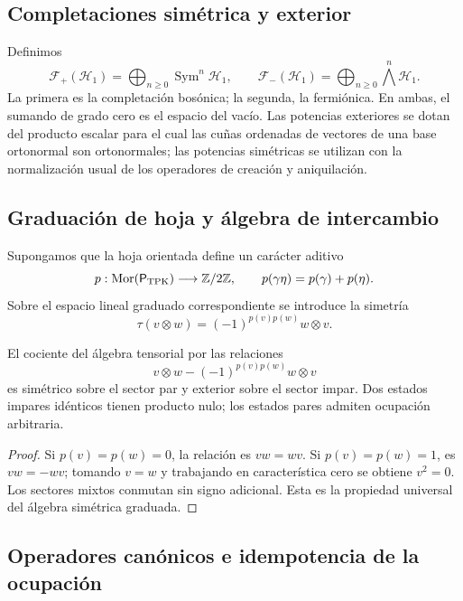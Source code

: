 \subsection{Completaciones simétrica y exterior}
\label{v:v:rec:completaciones:section:03}

Definimos
\[
 \mathcal F_+(\mathcal H_1)=
 \bigoplus_{n\geq0}\operatorname{Sym}^n\mathcal H_1,
 \qquad
 \mathcal F_-(\mathcal H_1)=
 \bigoplus_{n\geq0}\bigwedge^n\mathcal H_1.
\]
La primera es la completación bosónica; la segunda, la fermiónica. En ambas,
el sumando de grado cero es el espacio del vacío. Las potencias exteriores
se dotan del producto escalar para el cual las cuñas ordenadas de vectores
de una base ortonormal son ortonormales; las potencias simétricas se utilizan
con la normalización usual de los operadores de creación y aniquilación.

\subsection{Graduación de hoja y álgebra de intercambio}
\label{v:v:rec:completaciones:section:04}

Supongamos que la hoja orientada define un carácter aditivo
\[
 p:\operatorname{Mor}(\mathsf P_{\rm TPK})\longrightarrow\mathbb Z/2\mathbb Z,
 \qquad p(\gamma\eta)=p(\gamma)+p(\eta).
\]
Sobre el espacio lineal graduado correspondiente se introduce la simetría
\[
 \tau(v\otimes w)=(-1)^{p(v)p(w)}w\otimes v.
\]

\begin{theorem}
\label{v:v:rec:completaciones:statement:02}
El cociente del álgebra tensorial por las relaciones
\[
 v\otimes w-(-1)^{p(v)p(w)}w\otimes v
\]
es simétrico sobre el sector par y exterior sobre el sector impar. Dos estados
impares idénticos tienen producto nulo; los estados pares admiten ocupación
arbitraria.
\end{theorem}

\begin{proof}
Si \(p(v)=p(w)=0\), la relación es \(vw=wv\). Si
\(p(v)=p(w)=1\), es \(vw=-wv\); tomando \(v=w\) y trabajando en
característica cero se obtiene \(v^2=0\). Los sectores mixtos conmutan sin
signo adicional. Esta es la propiedad universal del álgebra simétrica
graduada.
\end{proof}

\subsection{Operadores canónicos e idempotencia de la ocupación}
\label{v:v:pauli:car-construccion}

